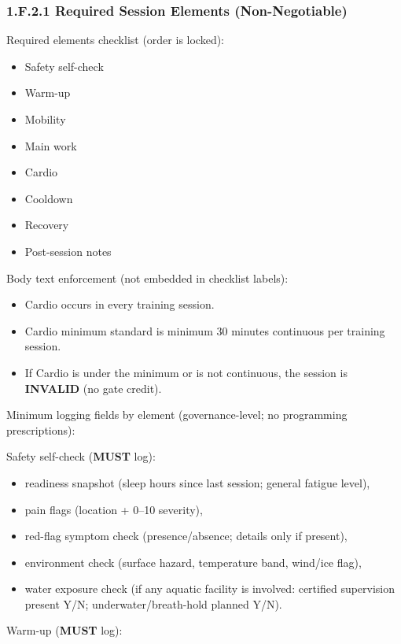 \documentclass[10pt]{article}
\begin{document}
\subsubsection*{1.F.2.1 Required Session Elements (Non-Negotiable)}

Required elements checklist (order is locked):

\begin{itemize}
\item Safety self-check
\item Warm-up
\item Mobility
\item Main work
\item Cardio
\item Cooldown
\item Recovery
\item Post-session notes
\end{itemize}

Body text enforcement (not embedded in checklist labels):

\begin{itemize}
\item Cardio occurs in every training session.
\item Cardio minimum standard is minimum 30 minutes continuous per training session.
\item If Cardio is under the minimum or is not continuous, the session is \textbf{INVALID}  (no gate credit).
\end{itemize}

Minimum logging fields by element (governance-level; no programming prescriptions):

Safety self-check (\textbf{MUST} log):

\begin{itemize}
\item readiness snapshot (sleep hours since last session; general fatigue level),
\item pain flags (location + 0–10 severity),
\item red-flag symptom check (presence/absence; details only if present),
\item environment check (surface hazard, temperature band, wind/ice flag),
\item water exposure check (if any aquatic facility is involved: certified supervision present Y/N; underwater/breath-hold planned Y/N).
\end{itemize}

Warm-up (\textbf{MUST} log):
\end{document}
